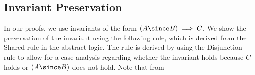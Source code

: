 \subsection{Invariant Preservation}
In our proofs, we use invariants of the form $(A \since B) \implies C$.
We show the preservation of the invariant using the following rule, 
which is derived from the  {\sc Shared} rule in the abstract logic.
The rule is derived by using the {\sc Disjunction} rule to allow for a 
case analysis regarding whether the invariant holds because  $C$ holds
or $(A \since B)$ does not hold.
Note that from 
% 
% 
% 
% 
% 
% 

